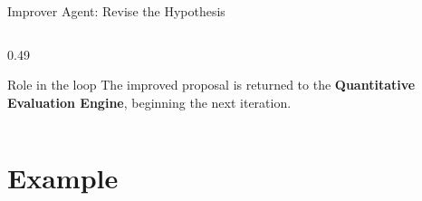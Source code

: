 \documentclass[10pt,aspectratio=169]{beamer}
\begin{document}
\begin{frame}{Improver Agent: Revise the Hypothesis}
\begin{columns}[T,onlytextwidth]
\begin{column}{0.49\textwidth}
\vspace{0.15cm}

\begin{block}{Role in the loop}
The improved proposal is returned to the
\textbf{Quantitative Evaluation Engine}, beginning the next iteration.
\end{block}

\end{column}

\end{columns}



\end{frame}


\section{Example}
\end{document}
